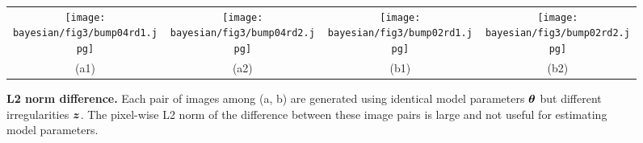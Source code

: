 \begin{figure}[h]
	\centering
	\setlength{\resLen}{0.24\columnwidth}
	\addtolength{\tabcolsep}{-5pt}
	\begin{tabular}{cccc}
		\texttt{[image: bayesian/fig3/bump04rd1.jpg]} &
		\texttt{[image: bayesian/fig3/bump04rd2.jpg]} &
		\texttt{[image: bayesian/fig3/bump02rd1.jpg]} &
		\texttt{[image: bayesian/fig3/bump02rd2.jpg]} \\
		(a1) & (a2) & (b1) & (b2)
	\end{tabular}
	\caption[L2 norm difference]{\label{fig:bayesian:sum_func}
		\textbf{L2 norm difference.} Each pair of images among (a, b) are generated using identical model parameters $\bm\theta$ but different irregularities $\bm{z}$. The pixel-wise L2 norm of the difference between these image pairs is large and not useful for estimating model parameters.
	}
\end{figure}